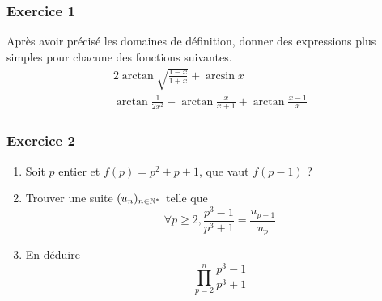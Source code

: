 \subsubsection*{Exercice 1}
Après avoir précisé les domaines de définition, donner des expressions plus simples pour chacune des fonctions suivantes.
\begin{align*}
2\arctan \sqrt{\frac{1-x}{1+x}}+\arcsin x\\
\arctan\frac{1}{2x^2}-\arctan\frac{x}{x+1}+\arctan\frac{x-1}{x}
\end{align*}

\subsubsection*{Exercice 2}
\begin{enumerate}
\item Soit $p$ entier et $f(p)=p^2+p+1$, que vaut $f(p-1)$ ?

\item Trouver une suite $(u_n)_{n\in \mathbb{N}^*}$ telle que
$$\forall p\geq 2 , \frac{p^3-1}{ p^3+1}=\frac{u_{p-1}}{u_{p}}$$
\item En déduire
$$\prod_{p=2}^{n}\frac{p^3-1}{p^3+1}$$
\end{enumerate}

